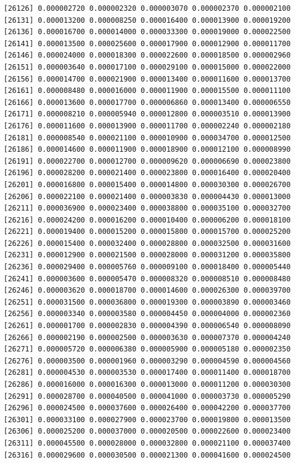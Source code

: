 \documentclass[]{article}
\begin{document}
\begin{verbatim}
[26126] 0.000002720 0.000002320 0.000003070 0.000002370 0.000002100
[26131] 0.000013200 0.000008250 0.000016400 0.000013900 0.000019200
[26136] 0.000016700 0.000014000 0.000033300 0.000019000 0.000022500
[26141] 0.000013500 0.000025600 0.000017900 0.000012900 0.000011700
[26146] 0.000024000 0.000018300 0.000022600 0.000018500 0.000002960
[26151] 0.000003640 0.000017100 0.000029100 0.000015000 0.000022000
[26156] 0.000014700 0.000021900 0.000013400 0.000011600 0.000013700
[26161] 0.000008480 0.000016000 0.000011900 0.000015500 0.000011100
[26166] 0.000013600 0.000017700 0.000006860 0.000013400 0.000006550
[26171] 0.000008210 0.000005940 0.000012800 0.000003510 0.000013900
[26176] 0.000011600 0.000013900 0.000011700 0.000002240 0.000002180
[26181] 0.000008540 0.000021100 0.000010900 0.000034700 0.000012500
[26186] 0.000014600 0.000011900 0.000018900 0.000012100 0.000008990
[26191] 0.000022700 0.000012700 0.000009620 0.000006690 0.000023800
[26196] 0.000028200 0.000021400 0.000023800 0.000016400 0.000020400
[26201] 0.000016800 0.000015400 0.000014800 0.000030300 0.000026700
[26206] 0.000022100 0.000021400 0.000003830 0.000004430 0.000013000
[26211] 0.000036900 0.000023400 0.000038800 0.000035100 0.000032700
[26216] 0.000024200 0.000016200 0.000010400 0.000006200 0.000018100
[26221] 0.000019400 0.000015200 0.000015800 0.000015700 0.000025200
[26226] 0.000015400 0.000032400 0.000028800 0.000032500 0.000031600
[26231] 0.000012900 0.000021500 0.000028000 0.000031200 0.000035800
[26236] 0.000029400 0.000005760 0.000009100 0.000018400 0.000005440
[26241] 0.000003600 0.000005470 0.000008320 0.000008510 0.000008480
[26246] 0.000003620 0.000018700 0.000014600 0.000026300 0.000039700
[26251] 0.000031500 0.000036800 0.000019300 0.000003890 0.000003460
[26256] 0.000003340 0.000003580 0.000004450 0.000004000 0.000002360
[26261] 0.000001700 0.000002830 0.000004390 0.000006540 0.000008090
[26266] 0.000002190 0.000002500 0.000003630 0.000007370 0.000004240
[26271] 0.000005720 0.000006380 0.000005900 0.000005180 0.000002350
[26276] 0.000003500 0.000001960 0.000003290 0.000004590 0.000004560
[26281] 0.000004530 0.000003530 0.000017400 0.000011400 0.000018700
[26286] 0.000016000 0.000016300 0.000013000 0.000011200 0.000030300
[26291] 0.000028700 0.000040500 0.000041000 0.000003730 0.000005290
[26296] 0.000024500 0.000037600 0.000026400 0.000042200 0.000037700
[26301] 0.000033100 0.000027900 0.000023700 0.000019800 0.000013500
[26306] 0.000025200 0.000037000 0.000020500 0.000022600 0.000023400
[26311] 0.000045500 0.000028000 0.000032800 0.000021100 0.000037400
[26316] 0.000029600 0.000030500 0.000021300 0.000041600 0.000024500

\end{verbatim}
\end{document}
